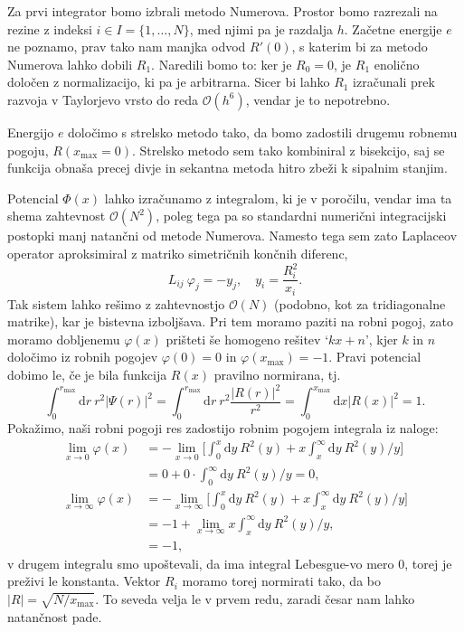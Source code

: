 \documentclass[a4 paper, 12pt]{article}
\renewcommand{\d}{
	\ensuremath{\mathrm{d}}
}
\begin{document}
Za prvi integrator bomo izbrali metodo Numerova. Prostor bomo razrezali na rezine z indeksi
$i \in I = \{1, \ldots, N\}$, med njimi pa je razdalja $h$. Za\v cetne energije $e$ ne poznamo,
prav tako nam manjka odvod $R'(0)$, s katerim bi za metodo Numerova lahko dobili $R_{1}$.
Naredili bomo to: ker je $R_0 = 0$, je $R_1$ enoli\v cno dolo\v cen z normalizacijo, ki pa je arbitrarna.
Sicer bi lahko $R_1$ izra\v cunali prek razvoja v Taylorjevo vrsto do reda $\mathcal{O}(h^6)$, vendar
je to nepotrebno.

Energijo $e$ dolo\v cimo s strelsko metodo tako, da bomo zadostili drugemu robnemu pogoju, $R(x_\text{max} = 0)$.
Strelsko metodo sem tako kombiniral z bisekcijo, saj se funkcija obna\v sa precej divje in sekantna metoda
hitro zbe\v zi k sipalnim stanjim.

Potencial $\Phi (x)$ lahko izra\v cunamo z integralom, ki je v poro\v cilu, vendar ima ta shema zahtevnost
$\mathcal{O}(N^2)$, poleg tega pa so standardni numeri\v cni integracijski postopki manj natan\v cni od metode
Numerova. Namesto tega sem zato Laplaceov operator aproksimiral z matriko simetri\v cnih kon\v cnih diferenc,
\begin{equation}
	L_{ij}\ \varphi_j = - y_j, \quad y_i = \frac{R^2_i}{x_i}.
\end{equation}
Tak sistem lahko re\v simo z zahtevnostjo $\mathcal{O}(N)$ (podobno, kot za tridiagonalne matrike), kar
je bistevna izbolj\v sava.
Pri tem moramo paziti na robni pogoj, zato moramo dobljenemu $\varphi (x)$ pri\v steti \v se homogeno
re\v sitev `$kx + n$', kjer $k$ in $n$ dolo\v cimo iz robnih pogojev  $\varphi(0) = 0$ in
$\varphi(x_\text{max}) = - 1$. Pravi potencial dobimo le, \v ce je bila funkcija $R(x)$ pravilno
normirana, tj.
\begin{equation}
	\int_0^{r_\text{max}} \d r\ r^2|\Psi(r)|^2 = \int_0^{r_\text{max}} \d r\ r^2 \frac{|R(r)|^2}
	{r^2} = \int_{0}^{x_\text{max}} \d x |R(x)|^2 = 1.
\end{equation}
Poka\v zimo, na\v si robni pogoji res zadostijo robnim pogojem integrala iz naloge:
\begin{align*}
	\lim_{x \to 0}\varphi(x) &= -\lim_{x \to 0} \bigg[\int_0^x \d y\ R^2(y) + x\int_x^\infty
		\d y\ R^2(y)/y\bigg] \\
		&= 0 + 0\cdot \int_0^\infty \d y\ R^2(y)/y = 0, \\
	\lim_{x \to \infty}\varphi(x) &= -\lim_{x \to \infty} \bigg[\int_0^x \d y\ R^2(y) + x\int_x^\infty
		\d y\ R^2(y)/y\bigg] \\
		&= -1 + \lim_{x \to \infty} x \int_x^\infty \d y\ R^2(y)/y, \\
		&= -1,
\end{align*}
v drugem integralu smo upo\v stevali, da ima integral Lebesgue-vo mero $0$, torej je pre\v zivi le konstanta.
Vektor $R_i$ moramo torej normirati tako, da bo $|R| = \sqrt{N/x_\text{max}}$. To seveda velja le v 
prvem redu, zaradi \v cesar nam lahko natan\v cnost pade.
\end{document}

